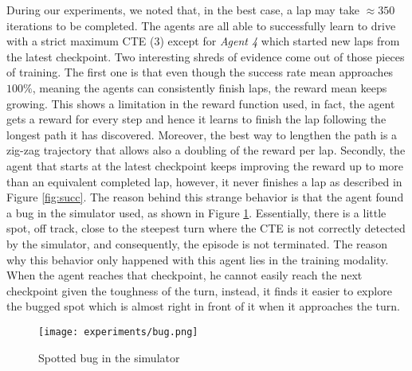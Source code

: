 During our experiments, we noted that, in the best case, a lap may take $\approx 350$ iterations to be completed. The agents are all able to successfully learn to drive with a strict maximum CTE (3) except for \textit{Agent 4} which started new laps from the latest checkpoint. Two interesting shreds of evidence come out of those pieces of training. The first one is that even though the success rate mean approaches $100\%$, meaning the agents can consistently finish laps, the reward mean keeps growing. This shows a limitation in the reward function used, in fact, the agent gets a reward for every step and hence it learns to finish the lap following the longest path it has discovered. Moreover, the best way to lengthen the path is a zig-zag trajectory that allows also a doubling of the reward per lap. Secondly, the agent that starts at the latest checkpoint keeps improving the reward up to more than an equivalent completed lap, however, it never finishes a lap as described in Figure \ref{fig:succ}. The reason behind this strange behavior is that the agent found a bug in the simulator used, as shown in Figure \ref{fig:bug}. Essentially, there is a little spot, off track, close to the steepest turn where the CTE is not correctly detected by the simulator, and consequently, the episode is not terminated. The reason why this behavior only happened with this agent lies in the training modality. When the agent reaches that checkpoint, he cannot easily reach the next checkpoint given the toughness of the turn, instead, it finds it easier to explore the bugged spot which is almost right in front of it when it approaches the turn.

\begin{figure}[h]
  \begin{center}
    \texttt{[image: experiments/bug.png]}
  \end{center}
  \caption{Spotted bug in the simulator}
  \label{fig:bug}
\end{figure}

